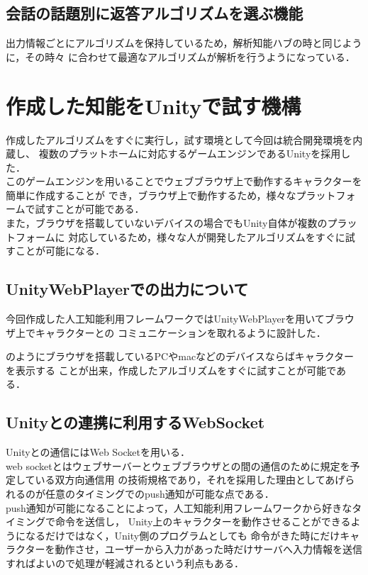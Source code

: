 \subsection{会話の話題別に返答アルゴリズムを選ぶ機能}
出力情報ごとにアルゴリズムを保持しているため，解析知能ハブの時と同じように，その時々
に合わせて最適なアルゴリズムが解析を行うようになっている．


\newpage


\section{作成した知能をUnityで試す機構}
作成したアルゴリズムをすぐに実行し，試す環境として今回は統合開発環境を内蔵し、
複数のプラットホームに対応するゲームエンジンであるUnityを採用した．
\\
このゲームエンジンを用いることでウェブブラウザ上で動作するキャラクターを簡単に作成することが
でき，ブラウザ上で動作するため，様々なプラットフォームで試すことが可能である．
\\
また，ブラウザを搭載していないデバイスの場合でもUnity自体が複数のプラットフォームに
対応しているため，様々な人が開発したアルゴリズムをすぐに試すことが可能になる．
\\

\subsection{UnityWebPlayerでの出力について}
今回作成した人工知能利用フレームワークではUnityWebPlayerを用いてブラウザ上でキャラクターとの
コミュニケーションを取れるように設計した．\\


のようにブラウザを搭載しているPCやmacなどのデバイスならばキャラクターを表示する
ことが出来，作成したアルゴリズムをすぐに試すことが可能である．
\\
\subsection{Unityとの連携に利用するWebSocket}
Unityとの通信にはWeb Socketを用いる．
\\
web socketとはウェブサーバーとウェブブラウザとの間の通信のために規定を予定している双方向通信用
の技術規格であり，それを採用した理由としてあげられるのが任意のタイミングでのpush通知が可能な点である．
\\
push通知が可能になることによって，人工知能利用フレームワークから好きなタイミングで命令を送信し，
Unity上のキャラクターを動作させることができるようになるだけではなく，Unity側のプログラムとしても
命令がきた時にだけキャラクターを動作させ，ユーザーから入力があった時だけサーバへ入力情報を送信
すればよいので処理が軽減されるという利点もある．\\

